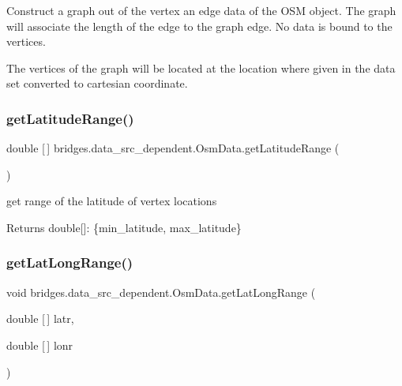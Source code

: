 Construct a graph out of the vertex an edge data of the O\+SM object. The graph will associate the length of the edge to the graph edge. No data is bound to the vertices.

The vertices of the graph will be located at the location where given in the data set converted to cartesian coordinate. \mbox{\label{classbridges_1_1data__src__dependent_1_1_osm_data_a406042fe56541f04c059a1f1ec887c81}} 
\subsubsection{\texorpdfstring{getLatitudeRange()}{getLatitudeRange()}}
{\footnotesize\ttfamily double \mbox{[}$\,$\mbox{]} bridges.\+data\+\_\+src\+\_\+dependent.\+Osm\+Data.\+get\+Latitude\+Range (\begin{DoxyParamCaption}{ }\end{DoxyParamCaption})}

get range of the latitude of vertex locations \begin{DoxyReturn}{Returns}
double\mbox{[}\mbox{]}\+: \{min\+\_\+latitude, max\+\_\+latitude\} 
\end{DoxyReturn}
\mbox{\label{classbridges_1_1data__src__dependent_1_1_osm_data_a2f80de5c73dd1bf72378e6a0573ba663}} 
\subsubsection{\texorpdfstring{getLatLongRange()}{getLatLongRange()}}
{\footnotesize\ttfamily void bridges.\+data\+\_\+src\+\_\+dependent.\+Osm\+Data.\+get\+Lat\+Long\+Range (\begin{DoxyParamCaption}\item[{double \mbox{[}$\,$\mbox{]}}]{latr,  }\item[{double \mbox{[}$\,$\mbox{]}}]{lonr }\end{DoxyParamCaption})}

